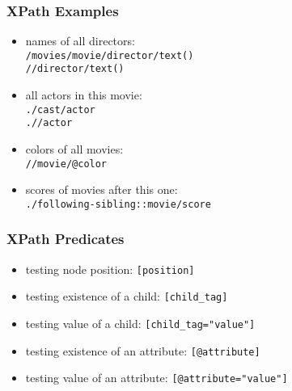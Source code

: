 \documentclass[dvipsnames]{beamer}
\theoremstyle{plain}
\begin{document}
\begin{frame}
  \frametitle{XPath Examples}

  \begin{example}
    \begin{itemize}
      \item names of all directors:\\
        \lstinline!/movies/movie/director/text()!\\
        \lstinline!//director/text()!

      \pause
      \item all actors in this movie:\\
        \lstinline!./cast/actor!\\
        \lstinline!.//actor!

      \pause
      \item colors of all movies:\\
        \lstinline!//movie/@color!

      \pause
      \item scores of movies after this one:\\
        \lstinline!./following-sibling::movie/score!
    \end{itemize}
  \end{example}
\end{frame}

\begin{frame}
  \frametitle{XPath Predicates}

  \begin{itemize}
    \item testing node position: \lstinline![position]!

    \pause
    \medskip
    \item testing existence of a child: \lstinline![child_tag]!
    \item testing value of a child: \lstinline![child_tag="value"]!

    \pause
    \medskip
    \item testing existence of an attribute: \lstinline![@attribute]!
    \item testing value of an attribute: \lstinline![@attribute="value"]!
  \end{itemize}
\end{frame}
\end{document}
